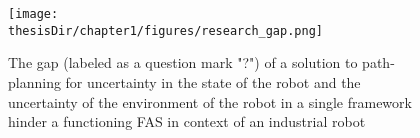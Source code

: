 \begin{figure}[h]
  \centering
  \captionsetup{justification=centering}
  \texttt{[image: \\thesisDir/chapter1/figures/research\_gap.png]}
  \caption{The gap (labeled as a question mark "?") of a solution to path-planning for uncertainty in the state of the robot and the uncertainty
of the environment of the robot in a single framework hinder a functioning FAS in context of an industrial
robot}
  \label{fig:research_gap}
\end{figure}

